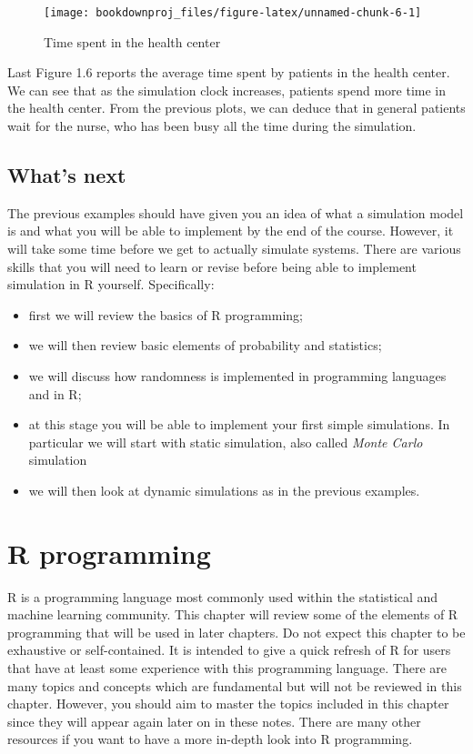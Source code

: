 \documentclass[
]{book}
\theoremstyle{definition}
\theoremstyle{definition}
\theoremstyle{definition}
\theoremstyle{definition}
\theoremstyle{remark}
\begin{document}
\begin{figure}

{\centering \texttt{[image: bookdownproj\_files/figure-latex/unnamed-chunk-6-1]} 

}

\caption{Time spent in the health center}\label{fig:unnamed-chunk-6}
\end{figure}

Last Figure 1.6 reports the average time spent by patients in the health center. We can see that as the simulation clock increases, patients spend more time in the health center. From the previous plots, we can deduce that in general patients wait for the nurse, who has been busy all the time during the simulation.

\hypertarget{whats-next}{%
\section{What's next}\label{whats-next}}

The previous examples should have given you an idea of what a simulation model is and what you will be able to implement by the end of the course. However, it will take some time before we get to actually simulate systems. There are various skills that you will need to learn or revise before being able to implement simulation in R yourself. Specifically:

\begin{itemize}
\item
  first we will review the basics of R programming;
\item
  we will then review basic elements of probability and statistics;
\item
  we will discuss how randomness is implemented in programming languages and in R;
\item
  at this stage you will be able to implement your first simple simulations. In particular we will start with static simulation, also called \emph{Monte Carlo} simulation
\item
  we will then look at dynamic simulations as in the previous examples.
\end{itemize}

\hypertarget{r-programming}{%
\chapter{R programming}\label{r-programming}}

R is a programming language most commonly used within the statistical and machine learning community. This chapter will review some of the elements of R programming that will be used in later chapters. Do not expect this chapter to be exhaustive or self-contained. It is intended to give a quick refresh of R for users that have at least some experience with this programming language. There are many topics and concepts which are fundamental but will not be reviewed in this chapter. However, you should aim to master the topics included in this chapter since they will appear again later on in these notes. There are many other resources if you want to have a more in-depth look into R programming.
\end{document}
